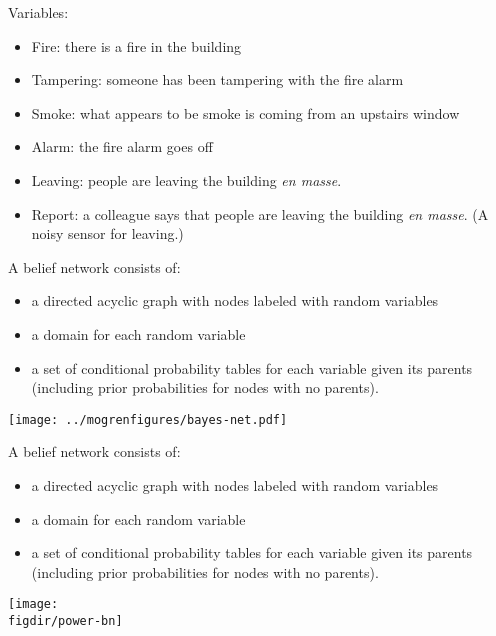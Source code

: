 \documentclass[12pt]{beamer} %
\newcommand{\figdir}{../../figures/ch06}
\begin{document}
\begin{slide}
Variables:
\begin{itemize}
\item \alert{Fire}: there is a fire in the building
\item \alert{Tampering}: someone has been tampering with the fire alarm
\item \alert{Smoke}: what appears to be smoke is coming from
  an upstairs window
\item \alert{Alarm}: the fire alarm goes off
\item \alert{Leaving}: people are leaving the building \emph{en
    masse}.
\item \alert{Report}: a colleague says that people are leaving the
  building  \emph{en
    masse}. (A noisy sensor for leaving.)
\end{itemize}
\end{slide}


\begin{slide}
A belief network consists of:
\begin{itemize}
\item a directed acyclic graph with nodes
labeled with random variables
\item a domain for each random
variable 
\item a set of conditional probability tables for each variable given
its parents (including prior probabilities for nodes
with no parents).
\end{itemize}
\end{slide}


\begin{slide}
\begin{center}
\texttt{[image: ../mogrenfigures/bayes-net.pdf]}
\end{center}
\end{slide}

\begin{slide}
A belief network consists of:
\begin{itemize}
\item a directed acyclic graph with nodes
labeled with random variables
\item a domain for each random
variable 
\item a set of conditional probability tables for each variable given
its parents (including prior probabilities for nodes
with no parents).
\end{itemize}
\end{slide}
\begin{slide}
\begin{center}
\texttt{[image: \\figdir/power-bn]}
\end{center}
\end{slide}
\end{document}
